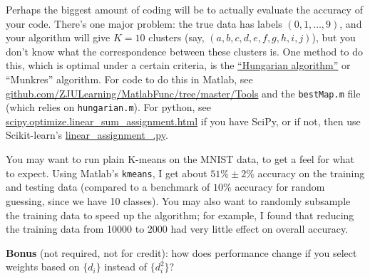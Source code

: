 \documentclass[10pt, letterpaper]{scrartcl}
\begin{document}
\begin{enumerate}[align=left, leftmargin=*, label=\sffamily\bfseries Problem \arabic*:]
    Perhaps the biggest amount of coding will be to actually evaluate the accuracy of your code. There's one major problem: the true data has labels $(0,1,\ldots,9)$, and your algorithm will give $K=10$ clusters (say, $(a,b,c,d,e,f,g,h,i,j)$), but you don't know what the correspondence between these clusters is. One method to do this, which is optimal under a certain criteria, is the \href{https://en.wikipedia.org/wiki/Hungarian_algorithm}{``Hungarian algorithm''} or ``Munkres'' algorithm. For code to do this in Matlab, see \href{https://github.com/ZJULearning/MatlabFunc/tree/master/Tools}{github.com/ZJULearning/MatlabFunc/tree/master/Tools} and the \texttt{bestMap.m} file (which relies on \texttt{hungarian.m}).  For python, see
    \href{https://docs.scipy.org/doc/scipy-0.18.1/reference/generated/scipy.optimize.linear_sum_assignment.html}{scipy.optimize.linear\_sum\_assignment.html} if you have SciPy, or if not, then use Scikit-learn's  \href{https://github.com/scikit-learn/scikit-learn/blob/master/sklearn/utils/linear_assignment_.py}{linear\_assignment\_.py}.
    
    
    You may want to run plain K-means on the MNIST data, to get a feel for what to expect. Using Matlab's \texttt{kmeans}, I get about $51\% \pm 2\%$ accuracy on the training and testing data (compared to a benchmark of $10\%$ accuracy for random guessing, since we have 10 classes).  You may also want to randomly subsample the training data to speed up the algorithm; for example, I found that reducing the training data from 10000 to 2000 had very little effect on overall accuracy.
    
    \textbf{Bonus} (not required, not for credit): how does performance change if you select weights based on $\{d_i\}$ instead of $\{d_i^2\}$?
    
    
    
    

\end{enumerate}   
\end{document}
